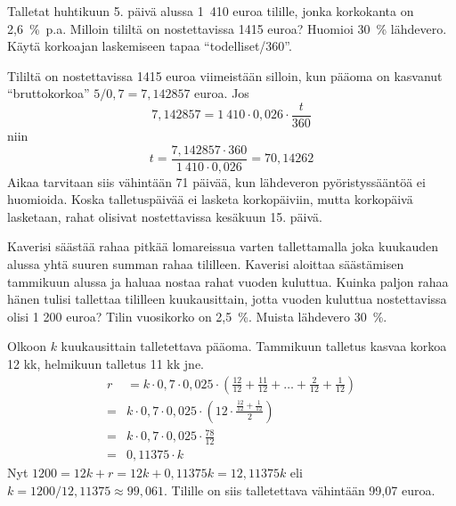 \documentclass[a4paper,10pt]{article}\usepackage[]{graphicx}\usepackage[]{color}
\begin{document}
\begin{question}
   Talletat huhtikuun 5. päivä alussa 1~410 euroa tilille, jonka korkokanta on 2{,}6~\%~p.a. Milloin tililtä on nostettavissa 1415 euroa? Huomioi 30~\% lähdevero. Käytä korkoajan laskemiseen tapaa ``todelliset/360''.
\end{question}
\begin{solution}
    Tililtä on nostettavissa 1415 euroa viimeistään silloin, kun pääoma on kasvanut ``bruttokorkoa'' \(5/0,7 = 7{,}142857\) euroa. Jos 
    \[
        7{,}142857 = 1~410\cdot0{,}026\cdot\frac{t}{360}
    \]
    niin
    \[
        t = \frac{7{,}142857\cdot360}{1~410\cdot0{,}026} = 70{,}14262
    \]
     Aikaa tarvitaan siis vähintään 71 päivää, kun lähdeveron pyöristyssääntöä ei huomioida.
    Koska talletuspäivää ei lasketa korkopäiviin, mutta korkopäivä lasketaan, rahat olisivat nostettavissa kesäkuun 15. päivä.
\end{solution}

\begin{question} 
    Kaverisi säästää rahaa pitkää lomareissua varten tallettamalla joka kuukauden alussa yhtä suuren summan rahaa tililleen.
Kaverisi aloittaa säästämisen tammikuun alussa ja haluaa nostaa rahat vuoden kuluttua.
Kuinka paljon rahaa hänen tulisi tallettaa tililleen kuukausittain, jotta vuoden kuluttua nostettavissa olisi 1 200 euroa? Tilin vuosikorko on 2{,}5~\%. Muista lähdevero 30~\%.
\end{question}\begin{solution}
    Olkoon \(k\) kuukausittain talletettava pääoma. Tammikuun talletus kasvaa korkoa 12 kk, helmikuun talletus 11 kk jne.
    \begin{align*}
        r &= k\cdot0,7\cdot0,025\cdot\left(\frac{12}{12} + \frac{11}{12} + \ldots + \frac{2}{12} + \frac{1}{12}\right)\\
         =& k\cdot0,7\cdot0,025\cdot\left(12\cdot\frac{\frac{12}{12} + \frac{1}{12}}{2}\right)\\
         =& k\cdot0,7\cdot0,025\cdot\frac{78}{12}\\
         =& 0,11375\cdot k
    \end{align*}
    Nyt \(1200 = 12k + r = 12k + 0,11375k = 12{,}11375k\) eli \(k = 1200/12{,}11375\approx 99,061\).
    Tilille on siis talletettava vähintään 99,07 euroa.
\end{solution}
\end{document}
